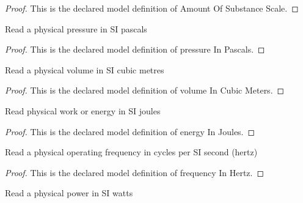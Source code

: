 \begin{proof}
  This is the declared model definition of Amount Of Substance Scale.
\end{proof}
\begin{definition}
  \label{def:physics:phyx-mini-0355:phyxminiproblems-problemphyxmini0355-pressureinpascals}
  Read a physical pressure in SI pascals
\end{definition}
\begin{proof}
  This is the declared model definition of pressure In Pascals.
\end{proof}
\begin{definition}
  \label{def:physics:phyx-mini-0355:phyxminiproblems-problemphyxmini0355-volumeincubicmeters}
  Read a physical volume in SI cubic metres
\end{definition}
\begin{proof}
  This is the declared model definition of volume In Cubic Meters.
\end{proof}
\begin{definition}
  \label{def:physics:phyx-mini-0355:phyxminiproblems-problemphyxmini0355-energyinjoules}
  Read physical work or energy in SI joules
\end{definition}
\begin{proof}
  This is the declared model definition of energy In Joules.
\end{proof}
\begin{definition}
  \label{def:physics:phyx-mini-0355:phyxminiproblems-problemphyxmini0355-frequencyinhertz}
  Read a physical operating frequency in cycles per SI second (hertz)
\end{definition}
\begin{proof}
  This is the declared model definition of frequency In Hertz.
\end{proof}
\begin{definition}
  \label{def:physics:phyx-mini-0355:phyxminiproblems-problemphyxmini0355-powerinwatts}
  Read a physical power in SI watts
\end{definition}
